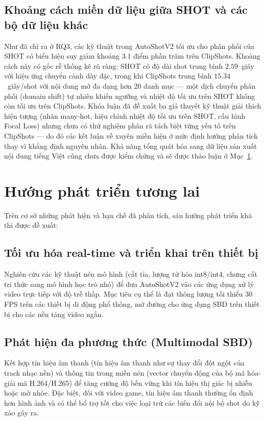 \subsection{Khoảng cách miền dữ liệu giữa SHOT và các bộ dữ liệu khác}
Như đã chỉ ra ở RQ3, các kỹ thuật trong AutoShotV2 tối ưu cho phân phối của SHOT có biểu hiện suy giảm khoảng $3.1$ điểm phần trăm trên ClipShots. Khoảng cách này có gốc rễ thống kê rõ ràng: SHOT có độ dài shot trung bình $2.59$~giây với hiệu ứng chuyển cảnh dày đặc, trong khi ClipShots trung bình $15.34$~giây/shot với nội dung mở đa dạng hơn 20 danh mục --- một dịch chuyển phân phối (domain shift) tự nhiên khiến ngưỡng và nhiệt độ tối ưu trên SHOT không còn tối ưu trên ClipShots. Khóa luận đã đề xuất ba giả thuyết kỹ thuật giải thích hiện tượng (nhãn many-hot, hiệu chỉnh nhiệt độ tối ưu trên SHOT, cấu hình Focal Loss) nhưng chưa có thử nghiệm phân rã tách biệt từng yếu tố trên ClipShots --- do đó các kết luận về xuyên miền hiện ở mức định hướng phân tích thay vì khẳng định nguyên nhân. Khả năng tổng quát hóa sang dữ liệu sản xuất nội dung tiếng Việt cũng chưa được kiểm chứng và sẽ được thảo luận ở Mục~\ref{sec:huong_phat_trien}.

\section{Hướng phát triển tương lai}
\label{sec:huong_phat_trien}

Trên cơ sở những phát hiện và hạn chế đã phân tích, sáu hướng phát triển khả thi được đề xuất:

\subsection{Tối ưu hóa real-time và triển khai trên thiết bị}
Nghiên cứu các kỹ thuật nén mô hình (cắt tỉa, lượng tử hóa int8/int4, chưng cất tri thức sang mô hình học trò nhỏ) để đưa AutoShotV2 vào các ứng dụng xử lý video trực tiếp với độ trễ thấp. Mục tiêu cụ thể là đạt thông lượng tối thiểu 30 FPS trên các thiết bị di động phổ thông, mở đường cho ứng dụng SBD trên thiết bị cho các nền tảng video ngắn.

\subsection{Phát hiện đa phương thức (Multimodal SBD)}
Kết hợp tín hiệu âm thanh (tín hiệu âm thanh như sự thay đổi đột ngột của track nhạc nền) và thông tin trong miền nén (vector chuyển động của bộ mã hóa-giải mã H.264/H.265) để tăng cường độ bền vững khi tín hiệu thị giác bị nhiễu hoặc mờ nhòe. Đặc biệt, đối với video game, tín hiệu âm thanh thường ổn định hơn hình ảnh và có thể bổ trợ tốt cho việc loại trừ các biến đổi nội bộ shot do kỹ xảo gây ra.

